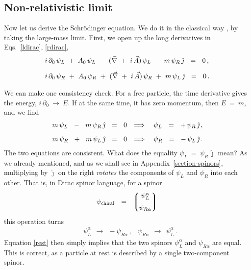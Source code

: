 \documentclass[epsfig,12pt]{article}
\newcommand{\p}{\partial}
\newcommand{\lgr}{\left\lgroup}
\newcommand{\rgr}{\right\rgroup}
\newcommand{\jj}{\hat\jmath}
\begin{document}
\subsection{Non-relativistic limit}

	Now let us derive the Schr\"odinger equation.
	We do it in the classical way \cite{Berestetsky:1982aq}, by taking the large-mass limit.
	First, we open up the long derivatives in Eqs.~\eqref{ldirac}, \eqref{rdirac},
\begin{align}
%
\notag
	&
	i\,\p_0\,\psi_L  ~+~  A_0\,\psi_L  ~-~  (\vec\nabla ~+~ i\,\vec A)\,\psi_L
	~-~  m\, \psi_R\, \jj	~~=~~	0\,,
	\\[2mm]
%
\label{dirac-split}
	&
	i\,\p_0\,\psi_R  ~+~  A_0\,\psi_R  ~+~  (\vec\nabla ~+~ i\,\vec A)\,\psi_R
	~+~  m\, \psi_L\, \jj  ~~=~~ 0\,.
\end{align}

	We can make one consistency check.
	For a free particle, the time derivative gives the energy,
	$ i\,\p_0 ~\to~ E $.
	If at the same time, it has zero momentum, then $ E ~=~ m $, and
	we find
\begin{align}
%
\notag
	&
	m\,\psi_L  ~~-~~  m\,\psi_R\,\jj	~~=~~	0
	&
	\Longrightarrow\quad \psi_L	~~=~~	+\,\psi_R\,\jj\,,
	\\[2mm]
%
\label{rest}
	&
	m\,\psi_R  ~~+~~  m\,\psi_L\,\jj	~~=~~	0
	&
	\Longrightarrow\quad \psi_R	~~=~~	-\,\psi_L\,\jj\,.
\end{align}
	The two equations are consistent.
	What does the equality $ \psi_L ~=~ \psi_R\,\jj $ mean?
	As we already mentioned, and as we shall see in Appendix~\ref{section-spinors},
	multiplying by $ \jj $ on the right
	\emph{rotates} the components of $ \psi_L $ and $ \psi_R $ into
	each other.
	That is, in Dirac spinor language, for a spinor
\begin{equation}
	\psi_\text{chiral}	~~=~~	\lgr 
						\begin{matrix}
							\psi_L^\alpha	\\[2mm]
							\psi_{R\dot\alpha}
						\end{matrix}
					\rgr
\end{equation}
	this operation turns
\begin{align}
	&
	\psi_L^\alpha	~~\to~~		-\psi_{R\dot\alpha}\,,
	&
	\psi_{R\dot\alpha}	~~\to~~		\psi_L^\alpha\,.
\end{align}
	Equation \eqref{rest} then simply implies that the two spinors
	$ \psi_L^\alpha $ and $ \psi_{R\dot\alpha} $ are equal.
	This is correct, as a particle at rest is described by a single
	two-component spinor.
\end{document}
